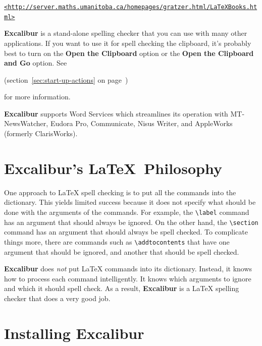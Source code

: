 ﻿\documentclass[11pt,titlepage]{article}
\newcommand{\ex}{\textbf{Excalibur}}
\begin{document}
\begin{latexonly}
\begin{alltt}
\url{<http://server.maths.umanitoba.ca/homepages/gratzer.html/LaTeXBooks.html>}
\end{alltt}
\end{latexonly}

\ex{} is a stand-alone spelling checker that you can use with many
other applications.  If you want to use it for spell checking the
clipboard, it's probably best to turn on the \textbf{Open the
  Clipboard} option or the \textbf{Open the Clipboard and Go} option.
See 
\begin{latexonly}
  (section~\ref{sec:start-up-actions} on
  page~\pageref{sec:start-up-actions})
\end{latexonly}
for more information.

\ex{} supports Word Services which streamlines its operation with
MT-NewsWatcher, Eudora Pro, Communicate, Nisus Writer, and
AppleWorks (formerly ClarisWorks).

\section{Excalibur's \LaTeX\ Philosophy}

One approach to \LaTeX{} spell checking is to put all the commands
into the dictionary. This yields limited success because it does not
specify what should be done with the arguments of the commands. For
example, the \verb+\label+ command has an argument that should always
be ignored. On the other hand, the \verb+\section+ command has an
argument that should always be spell checked. To complicate things
more, there are commands such as \verb+\addtocontents+ that have one
argument that should be ignored, and another that should be spell
checked.

\ex{} does \emph{not} put \LaTeX{} commands into its dictionary.
Instead, it knows how to process each command intelligently. It knows
which arguments to ignore and which it should spell check. As a
result, \ex{} is a \LaTeX{} spelling checker that does a very good
job.

\section{Installing Excalibur}
\end{document}
